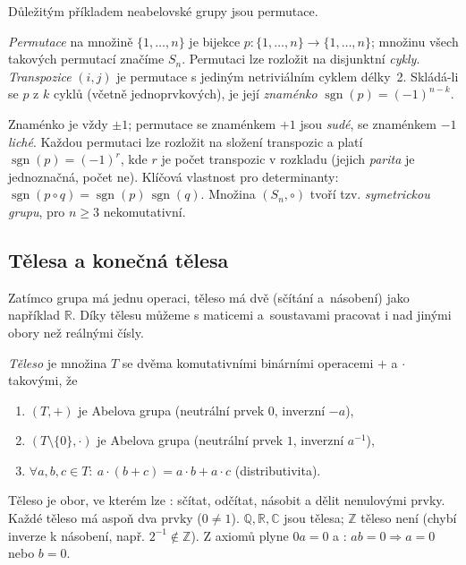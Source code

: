\documentclass[11pt,a4paper]{article}
\newcommand{\sgn}{\operatorname{sgn}}
\begin{document}
Důležitým příkladem neabelovské grupy jsou permutace.

\begin{definice}
\emph{Permutace} na množině $\{1,\dots,n\}$ je bijekce $p:\{1,\dots,n\}\to\{1,\dots,n\}$; množinu všech takových permutací značíme $S_n$. Permutaci lze rozložit na disjunktní \emph{cykly}. \emph{Transpozice} $(i,j)$ je permutace s jediným netriviálním cyklem délky~2. Skládá-li se $p$ z $k$ cyklů (včetně jednoprvkových), je její \emph{znaménko} $\sgn(p)=(-1)^{n-k}$.
\end{definice}

\begin{poznamka}
Znaménko je vždy $\pm1$; permutace se znaménkem $+1$ jsou \emph{sudé}, se znaménkem $-1$ \emph{liché}. Každou permutaci lze rozložit na složení transpozic a platí $\sgn(p)=(-1)^r$, kde $r$ je počet transpozic v rozkladu (jejich \emph{parita} je jednoznačná, počet ne). Klíčová vlastnost pro determinanty: $\sgn(p\circ q)=\sgn(p)\,\sgn(q)$. Množina $(S_n,\circ)$ tvoří tzv. \emph{symetrickou grupu}, pro $n\ge3$ nekomutativní.
\end{poznamka}

\subsection{Tělesa a konečná tělesa}

Zatímco grupa má jednu operaci, těleso má dvě (sčítání a~násobení) jako například $\mathbb{R}$. Díky tělesu můžeme s maticemi a~soustavami pracovat i nad jinými obory než reálnými čísly.

\begin{definice}[Těleso]
\emph{Těleso} je množina $T$ se dvěma komutativními binárními operacemi $+$ a $\cdot$ takovými, že
\begin{enumerate}[label=(\arabic*)]
  \item $(T,+)$ je Abelova grupa (neutrální prvek $0$, inverzní $-a$),
  \item $(T\setminus\{0\},\cdot)$ je Abelova grupa (neutrální prvek $1$, inverzní $a^{-1}$),
  \item $\forall a,b,c\in T:\ a\cdot(b+c)=a\cdot b+a\cdot c$ \quad (distributivita).
\end{enumerate}
\end{definice}

\begin{intuice}
Těleso je obor, ve kterém lze : sčítat, odčítat, násobit a dělit nenulovými prvky. Každé těleso má aspoň dva prvky ($0\neq1$). $\mathbb{Q},\mathbb{R},\mathbb{C}$ jsou tělesa; $\mathbb{Z}$ těleso není (chybí inverze k násobení, např. $2^{-1}\notin\mathbb{Z}$). Z axiomů plyne $0a=0$ a : $ab=0\Rightarrow a=0$ nebo $b=0$.
\end{intuice}
\end{document}
